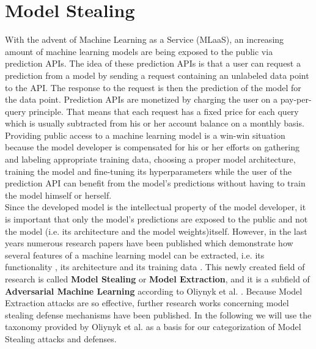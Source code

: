 \section{Model Stealing}
\label{sec:ModelStealing}
With the advent of Machine Learning as a Service (MLaaS), an increasing amount of machine learning models are being exposed to the public via 
prediction APIs. The idea of these prediction APIs is that a user can request a prediction from a model by sending a request containing an unlabeled data
point to the API. The response to the request is then the prediction of the model for the data point. Prediction APIs are monetized by charging the user
on a pay-per-query principle. That means that each request has a fixed price for each query which is usually subtracted from his or her account balance on
a monthly basis. Providing public access to a machine learning model is a win-win situation because the model developer is compensated for his or her efforts
on gathering and labeling appropriate training data, choosing a proper model architecture, training the model and fine-tuning its hyperparameters while the user
of the prediction API can benefit from the model's predictions without having to train the model himself or herself. \\
Since the developed model is the intellectual property of the model developer, it is important that only the model's predictions are exposed to the public and
not the model (i.e. its architecture and the model weights)itself. However, in the last years numerous research papers have been published which demonstrate how
several features of a machine learning model can be extracted, i.e. its functionality \cite{tramer2016stealing}, its architecture \cite{oh2019towards} and its
training data \cite{shokri2017membership}. This newly created field of research is called \textbf{Model Stealing} or \textbf{Model Extraction}, and it is a subfield
of \textbf{Adversarial Machine Learning} according to Oliynyk et al. \cite{oliynyk2022know}. Because Model Extraction attacks are so effective, further research works
concerning model stealing defense mechanisms have been published. In the following we will use the taxonomy provided by Oliynyk et al.
\cite{oliynyk2022know} as a basis for our categorization of Model Stealing attacks and defenses. \\

